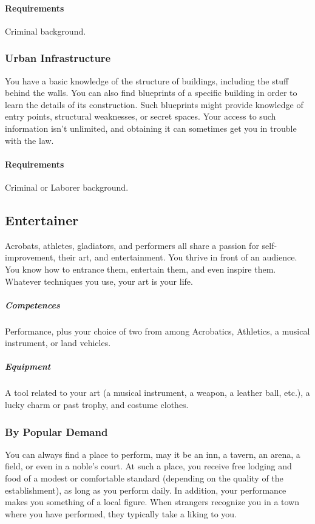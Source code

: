             \paragraph{Requirements} Criminal background.
        \subsubsection{Urban Infrastructure} \label{feat::urbaninfrastructure}
            You have a basic knowledge of the structure of buildings, including the stuff behind the walls.
            You can also find blueprints of a specific building in order to learn the details of its construction.
            Such blueprints might provide knowledge of entry points, structural weaknesses, or secret spaces.
            Your access to such information isn't unlimited, and obtaining it can sometimes get you in trouble with the law.
            \paragraph{Requirements} Criminal or Laborer background.
\subsection*{Entertainer} \label{ssec::entertainer}
    Acrobats, athletes, gladiators, and performers all share a passion for self-improvement, their art, and entertainment. %
    You thrive in front of an audience.
    You know how to entrance them, entertain them, and even inspire them.
    Whatever techniques you use, your art is your life.

    \subparagraph{Competences} Performance, plus your choice of two from among Acrobatics, Athletics, a musical instrument, or land vehicles.

    \subparagraph{Equipment} A tool related to your art (a musical instrument, a weapon, a leather ball, etc.), a lucky charm or past trophy, and costume clothes.

    \subsubsection{By Popular Demand} \label{feat::bypopulardemand}
        You can always find a place to perform, may it be an inn, a tavern, an arena, a field, or even in a noble's court.
        At such a place, you receive free lodging and food of a modest or comfortable standard (depending on the quality of the establishment), as long as you perform daily.
        In addition, your performance makes you something of a local figure.
        When strangers recognize you in a town where you have performed, they typically take a liking to you.


